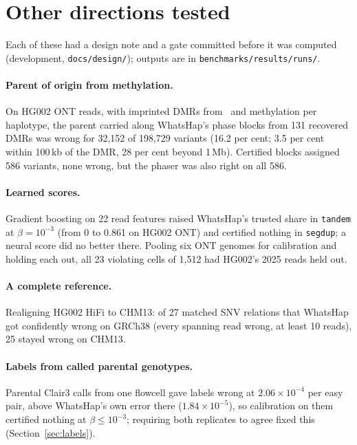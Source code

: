 \documentclass[11pt]{article}
\theoremstyle{definition}
\theoremstyle{remark}
\begin{document}
\section{Other directions tested}\label{app:other}

Each of these had a design note and a gate committed before it was computed
(development, \nolinkurl{docs/design/}); outputs are in
\nolinkurl{benchmarks/results/runs/}.

\paragraph{Parent of origin from methylation.} On HG002 ONT reads, with
imprinted DMRs from~\cite{akbari2022} and methylation per haplotype, the
parent carried along WhatsHap's phase blocks from 131 recovered DMRs was
wrong for 32{,}152 of 198{,}729 variants (16.2 per cent; 3.5 per cent within
100\,kb of the DMR, 28 per cent beyond 1\,Mb). Certified blocks assigned 586
variants, none wrong, but the phaser was also right on all 586.

\paragraph{Learned scores.} Gradient boosting on 22 read features raised
WhatsHap's trusted share in \texttt{tandem} at $\beta=10^{-3}$ (from 0 to
0.861 on HG002 ONT) and certified nothing in \texttt{segdup}; a neural score
did no better there. Pooling six ONT genomes for calibration and holding
each out, all 23 violating cells of 1{,}512 had HG002's 2025 reads held out.

\paragraph{A complete reference.} Realigning HG002 HiFi to CHM13: of 27
matched SNV relations that WhatsHap got confidently wrong on GRCh38 (every
spanning read wrong, at least 10 reads), 25 stayed wrong on CHM13.

\paragraph{Labels from called parental genotypes.} Parental Clair3 calls
from one flowcell gave labels wrong at $2.06\times10^{-4}$ per easy pair,
above WhatsHap's own error there ($1.84\times10^{-5}$), so calibration on
them certified nothing at $\beta\le10^{-3}$; requiring both replicates to
agree fixed this (Section~\ref{sec:labels}).
\end{document}
